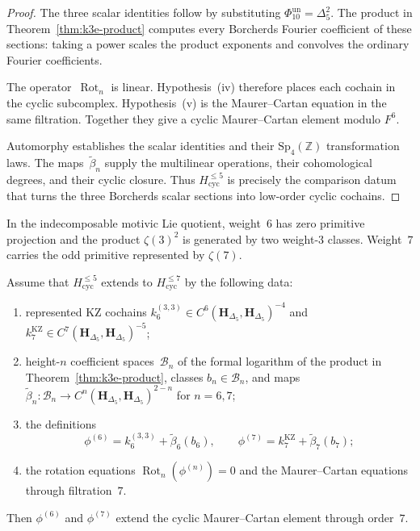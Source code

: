 \begin{proof}
The three scalar identities follow by substituting
$\Phi_{10}^{\mathrm{un}}=\Delta_5^2$.  The product in
Theorem~\ref{thm:k3e-product} computes every Borcherds
Fourier coefficient of these sections: taking a power scales the
product exponents and convolves the ordinary Fourier coefficients.

The operator~$\operatorname{Rot}_n$ is linear.  Hypothesis~(iv)
therefore places each cochain in the cyclic subcomplex.  Hypothesis~(v)
is the Maurer--Cartan equation in the same filtration.  Together they
give a cyclic Maurer--Cartan element modulo $F^6$.

Automorphy establishes the scalar identities and their
$\mathrm{Sp}_4(\mathbb Z)$ transformation laws.  The maps~$\widetilde\beta_n$
supply the multilinear operations, their cohomological degrees, and
their cyclic closure.  Thus $H_{\mathrm{cyc}}^{\leq5}$ is precisely
the comparison datum that turns the three Borcherds scalar sections
into low-order cyclic cochains.
\end{proof}

\begin{theorem}
\label{thm:cyclic-invariance-phi-67}
In the indecomposable motivic Lie quotient, weight~$6$ has zero
primitive projection and the product $\zeta(3)^2$ is generated by two
weight-$3$ classes.  Weight~$7$ carries the odd primitive represented
by $\zeta(7)$.

Assume that $H_{\mathrm{cyc}}^{\leq5}$ extends to
$H_{\mathrm{cyc}}^{\leq7}$ by the following data:
\begin{enumerate}[label=\textup{(\roman*)}]
\item represented KZ cochains
$k_6^{(3,3)}\in
C^6(\mathbf H_{\Delta_5},\mathbf H_{\Delta_5})^{-4}$ and
$k_7^{\mathrm{KZ}}\in
C^7(\mathbf H_{\Delta_5},\mathbf H_{\Delta_5})^{-5}$;
\item height-$n$ coefficient spaces~$\mathscr B_n$ of the formal
logarithm of the product in Theorem~\ref{thm:k3e-product}, classes
$b_n\in\mathscr B_n$, and maps
$\widetilde\beta_n\colon\mathscr B_n\to
C^n(\mathbf H_{\Delta_5},\mathbf H_{\Delta_5})^{2-n}$
for $n=6,7$;
\item the definitions
\[
 \phi^{(6)}=k_6^{(3,3)}+\widetilde\beta_6(b_6),
 \qquad
 \phi^{(7)}=k_7^{\mathrm{KZ}}+\widetilde\beta_7(b_7);
\]
\item the rotation equations
$\operatorname{Rot}_n(\phi^{(n)})=0$ and the Maurer--Cartan equations
through filtration~$7$.
\end{enumerate}
Then $\phi^{(6)}$ and $\phi^{(7)}$ extend the cyclic
Maurer--Cartan element through order~$7$.
\end{theorem}

